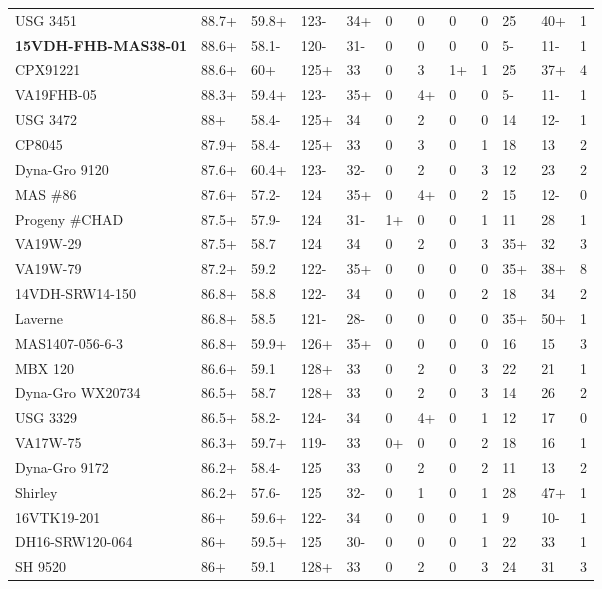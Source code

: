 \documentclass[12pt, letterpaper]{article}
\begin{document}
\begin{landscape}
\begin{ThreePartTable}
\begin{longtable}{llllllllllll}
  USG 3451 & 88.7+ & 59.8+ & 123- & 34+ & 0 & 0 & 0 & 0 & 25 & 40+ & 1 \\ 
  \textbf{15VDH-FHB-MAS38-01} & 88.6+ & 58.1- & 120- & 31- & 0 & 0 & 0 & 0 & 5- & 11- & 1 \\ 
  CPX91221 & 88.6+ & 60+ & 125+ & 33 & 0 & 3 & 1+ & 1 & 25 & 37+ & 4 \\ 
  VA19FHB-05 & 88.3+ & 59.4+ & 123- & 35+ & 0 & 4+ & 0 & 0 & 5- & 11- & 1 \\ 
  USG 3472 & 88+ & 58.4- & 125+ & 34 & 0 & 2 & 0 & 0 & 14 & 12- & 1 \\ 
  CP8045 & 87.9+ & 58.4- & 125+ & 33 & 0 & 3 & 0 & 1 & 18 & 13 & 2 \\ 
  Dyna-Gro 9120 & 87.6+ & 60.4+ & 123- & 32- & 0 & 2 & 0 & 3 & 12 & 23 & 2 \\ 
  MAS \#86 & 87.6+ & 57.2- & 124 & 35+ & 0 & 4+ & 0 & 2 & 15 & 12- & 0 \\ 
  Progeny \#CHAD & 87.5+ & 57.9- & 124 & 31- & 1+ & 0 & 0 & 1 & 11 & 28 & 1 \\ 
  VA19W-29 & 87.5+ & 58.7 & 124 & 34 & 0 & 2 & 0 & 3 & 35+ & 32 & 3 \\ 
  VA19W-79 & 87.2+ & 59.2 & 122- & 35+ & 0 & 0 & 0 & 0 & 35+ & 38+ & 8 \\ 
  14VDH-SRW14-150 & 86.8+ & 58.8 & 122- & 34 & 0 & 0 & 0 & 2 & 18 & 34 & 2 \\ 
  Laverne & 86.8+ & 58.5 & 121- & 28- & 0 & 0 & 0 & 0 & 35+ & 50+ & 1 \\ 
  MAS1407-056-6-3 & 86.8+ & 59.9+ & 126+ & 35+ & 0 & 0 & 0 & 0 & 16 & 15 & 3 \\ 
  MBX 120 & 86.6+ & 59.1 & 128+ & 33 & 0 & 2 & 0 & 3 & 22 & 21 & 1 \\ 
  Dyna-Gro WX20734 & 86.5+ & 58.7 & 128+ & 33 & 0 & 2 & 0 & 3 & 14 & 26 & 2 \\ 
  USG 3329 & 86.5+ & 58.2- & 124- & 34 & 0 & 4+ & 0 & 1 & 12 & 17 & 0 \\ 
  VA17W-75 & 86.3+ & 59.7+ & 119- & 33 & 0+ & 0 & 0 & 2 & 18 & 16 & 1 \\ 
  Dyna-Gro 9172 & 86.2+ & 58.4- & 125 & 33 & 0 & 2 & 0 & 2 & 11 & 13 & 2 \\ 
  Shirley & 86.2+ & 57.6- & 125 & 32- & 0 & 1 & 0 & 1 & 28 & 47+ & 1 \\ 
  16VTK19-201 & 86+ & 59.6+ & 122- & 34 & 0 & 0 & 0 & 1 & 9 & 10- & 1 \\ 
  DH16-SRW120-064 & 86+ & 59.5+ & 125 & 30- & 0 & 0 & 0 & 1 & 22 & 33 & 1 \\ 
  SH 9520 & 86+ & 59.1 & 128+ & 33 & 0 & 2 & 0 & 3 & 24 & 31 & 3 \\ 

\end{longtable}
\end{ThreePartTable}
\end{landscape}
\end{document}
